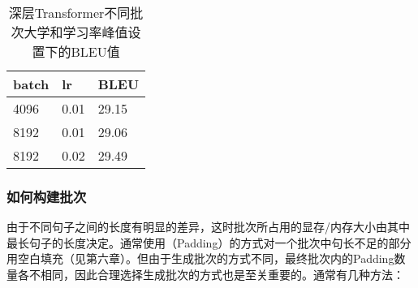 \begin{table}[htp]
\centering
\caption{深层Transformer不同批次大学和学习率峰值设置下的BLEU值}
\begin{tabular}{ l | l  l }
\rule{0pt}{13pt} batch & lr & BLEU \\ \hline
\rule{0pt}{13pt} 4096 & 0.01 & 29.15 \\
\rule{0pt}{13pt} 8192 & 0.01 & 29.06 \\
\rule{0pt}{13pt} 8192 & 0.02 & 29.49
\end{tabular}
\label{tab:7-3}
\end{table}


\subsubsection{如何构建批次}

\parinterval 由于不同句子之间的长度有明显的差异，这时批次所占用的显存/内存大小由其中最长句子的长度决定。通常使用{\small{}}（Padding）的方式对一个批次中句长不足的部分用空白填充（见第六章）。但由于生成批次的方式不同，最终批次内的Padding数量各不相同，因此合理选择生成批次的方式也是至关重要的。通常有几种方法：

